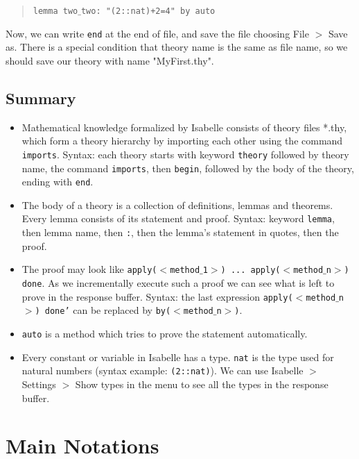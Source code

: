 \documentclass[11pt]{article}
\newcommand{\prog}[1]{\par\noindent\begin{quote}#1\end{quote}\par\noindent}
\begin{document}
\prog{\tt lemma two$\_$two: "(2::nat)+2=4" by auto}%

Now, we can write {\tt end} at the end of file, and save the file choosing File $>$ Save as. There is a special condition that theory name is the same as file name, so we should save our theory with name "MyFirst.thy".

\subsection{Summary}

\begin{itemize}

    \item Mathematical knowledge formalized by Isabelle consists of theory files *.thy, which form a theory hierarchy by importing each other using the command {\tt imports}. Syntax: each theory starts with keyword {\tt theory} followed by theory name, the command {\tt imports}, then {\tt begin}, followed by the body of the theory, ending with {\tt end}.

    \item The body of a theory is a collection of definitions, lemmas and theorems. Every lemma consists of its statement and proof. Syntax: keyword {\tt lemma}, then lemma name, then {\tt :}, then the lemma's statement in quotes, then the proof.

    \item The proof may look like {\tt apply($<$method$\_$1$>$) ... apply($<$method$\_$n$>$) done}. As we incrementally execute such a proof we can see what is left to prove in the response buffer. Syntax: the last expression {\tt apply($<$method$\_$n$>$) done'} can be replaced by {\tt by($<$method$\_$n$>$)}.

    \item {\tt auto} is a method which tries to prove the statement automatically.

    \item Every constant or variable in Isabelle has a type. {\tt nat} is the type used for natural numbers (syntax example: {\tt (2::nat)}). We can use Isabelle $>$ Settings $>$ Show types in the menu to see all the types in the response buffer.

\end{itemize}

\section{Main Notations}
\end{document}
